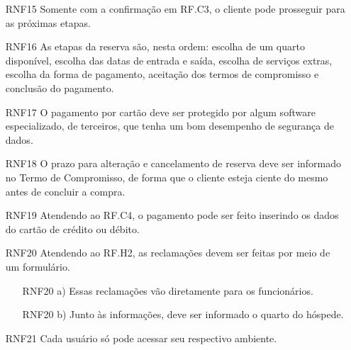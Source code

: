 \documentclass[notitlepage]{article}
\begin{document}
\begin{enumerate}
	\item[RNF15 ] Somente com a confirmação em RF.C3, o cliente pode prosseguir para as próximas etapas.
	\item[RNF16 ] As etapas da reserva são, nesta ordem: escolha de um quarto disponível, escolha das datas de entrada e saída, escolha de serviços extras, escolha da forma de pagamento, aceitação dos termos de compromisso e conclusão do pagamento.
	\item[RNF17 ] O pagamento por cartão deve ser protegido por algum software especializado, de terceiros, que tenha um bom desempenho de segurança de dados.
	\item[RNF18 ] O prazo para alteração e cancelamento de reserva deve ser informado no Termo de Compromisso, de forma que o cliente esteja ciente do mesmo antes de concluir a compra.
	\item[RNF19 ] Atendendo ao RF.C4, o pagamento pode ser feito inserindo os dados do cartão de crédito ou débito. 
	\item[RNF20 ] Atendendo ao RF.H2, as reclamações devem ser feitas por meio de um formulário. 
	\begin{enumerate}
	\item[RNF20 a) ] Essas reclamações vão diretamente para os funcionários.
	\item[RNF20 b) ] Junto às informações, deve ser informado o quarto do hóspede.
	\end{enumerate}	
	\item[RNF21 ] Cada usuário só pode acessar seu respectivo ambiente.
\end{enumerate}

\tableofcontents
\end{document}
